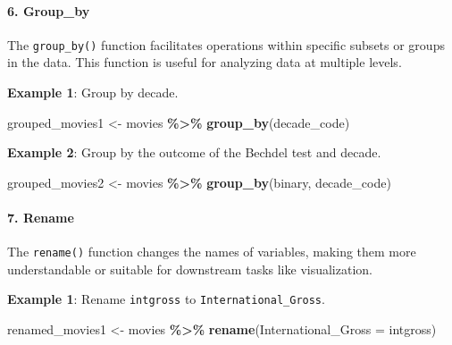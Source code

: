 \documentclass[
]{book}
\newenvironment{Shaded}{\begin{snugshade}}{\end{snugshade}}
\newcommand{\AttributeTok}[1]{\textcolor[rgb]{0.13,0.29,0.53}{#1}}
\newcommand{\FunctionTok}[1]{\textcolor[rgb]{0.13,0.29,0.53}{\textbf{#1}}}
\newcommand{\NormalTok}[1]{#1}
\newcommand{\OtherTok}[1]{\textcolor[rgb]{0.56,0.35,0.01}{#1}}
\newcommand{\SpecialCharTok}[1]{\textcolor[rgb]{0.81,0.36,0.00}{\textbf{#1}}}
\begin{document}
\paragraph*{6. Group\_by}\label{group_by}

The \texttt{group\_by()} function facilitates operations within specific subsets or groups in the data. This function is useful for analyzing data at multiple levels.

\textbf{Example 1}: Group by decade.

\begin{Shaded}
\begin{Highlighting}[]
\NormalTok{grouped\_movies1 }\OtherTok{\textless{}{-}}\NormalTok{ movies }\SpecialCharTok{\%\textgreater{}\%}
  \FunctionTok{group\_by}\NormalTok{(decade\_code)}
\end{Highlighting}
\end{Shaded}

\textbf{Example 2}: Group by the outcome of the Bechdel test and decade.

\begin{Shaded}
\begin{Highlighting}[]
\NormalTok{grouped\_movies2 }\OtherTok{\textless{}{-}}\NormalTok{ movies }\SpecialCharTok{\%\textgreater{}\%}
  \FunctionTok{group\_by}\NormalTok{(binary, decade\_code)}
\end{Highlighting}
\end{Shaded}

\paragraph*{7. Rename}\label{rename}

The \texttt{rename()} function changes the names of variables, making them more understandable or suitable for downstream tasks like visualization.

\textbf{Example 1}: Rename \texttt{intgross} to \texttt{International\_Gross}.

\begin{Shaded}
\begin{Highlighting}[]
\NormalTok{renamed\_movies1 }\OtherTok{\textless{}{-}}\NormalTok{ movies }\SpecialCharTok{\%\textgreater{}\%}
  \FunctionTok{rename}\NormalTok{(}\AttributeTok{International\_Gross =}\NormalTok{ intgross)}
\end{Highlighting}
\end{Shaded}
\end{document}
